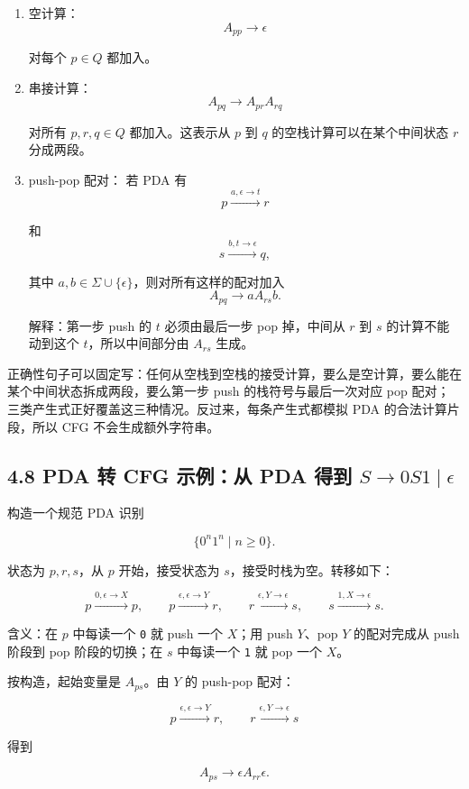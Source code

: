 ﻿\documentclass[UTF8,11pt]{ctexart}
\begin{document}
\begin{enumerate}
\item 空计算：
\[
   A_{pp}\to\epsilon
   \]

对每个 \(p\in Q\) 都加入。
\item 串接计算：
\[
   A_{pq}\to A_{pr}A_{rq}
   \]

对所有 \(p,r,q\in Q\) 都加入。这表示从 \(p\) 到 \(q\) 的空栈计算可以在某个中间状态 \(r\) 分成两段。
\item push-pop 配对：
若 PDA 有
\[
   p\xrightarrow{a,\epsilon\to t}r
   \]

和
\[
   s\xrightarrow{b,t\to\epsilon}q,
   \]

其中 \(a,b\in\Sigma\cup\{\epsilon\}\)，则对所有这样的配对加入
\[
   A_{pq}\to aA_{rs}b.
   \]

解释：第一步 push 的 \(t\) 必须由最后一步 pop 掉，中间从 \(r\) 到 \(s\) 的计算不能动到这个 \(t\)，所以中间部分由 \(A_{rs}\) 生成。
\end{enumerate}


正确性句子可以固定写：任何从空栈到空栈的接受计算，要么是空计算，要么能在某个中间状态拆成两段，要么第一步 push 的栈符号与最后一次对应 pop 配对；三类产生式正好覆盖这三种情况。反过来，每条产生式都模拟 PDA 的合法计算片段，所以 CFG 不会生成额外字符串。


\subsection{4.8 PDA 转 CFG 示例：从 PDA 得到 \(S\to0S1\mid\epsilon\)}


构造一个规范 PDA 识别

\[
\{0^n1^n\mid n\ge0\}.
\]

状态为 \(p,r,s\)，从 \(p\) 开始，接受状态为 \(s\)，接受时栈为空。转移如下：

\[
p\xrightarrow{0,\epsilon\to X}p,\qquad
p\xrightarrow{\epsilon,\epsilon\to Y}r,\qquad
r\xrightarrow{\epsilon,Y\to\epsilon}s,\qquad
s\xrightarrow{1,X\to\epsilon}s.
\]

含义：在 \(p\) 中每读一个 \texttt{0} 就 push 一个 \(X\)；用 push \(Y\)、pop \(Y\) 的配对完成从 push 阶段到 pop 阶段的切换；在 \(s\) 中每读一个 \texttt{1} 就 pop 一个 \(X\)。


按构造，起始变量是 \(A_{ps}\)。由 \(Y\) 的 push-pop 配对：

\[
p\xrightarrow{\epsilon,\epsilon\to Y}r,\qquad
r\xrightarrow{\epsilon,Y\to\epsilon}s
\]

得到

\[
A_{ps}\to \epsilon A_{rr}\epsilon.
\]
\end{document}
